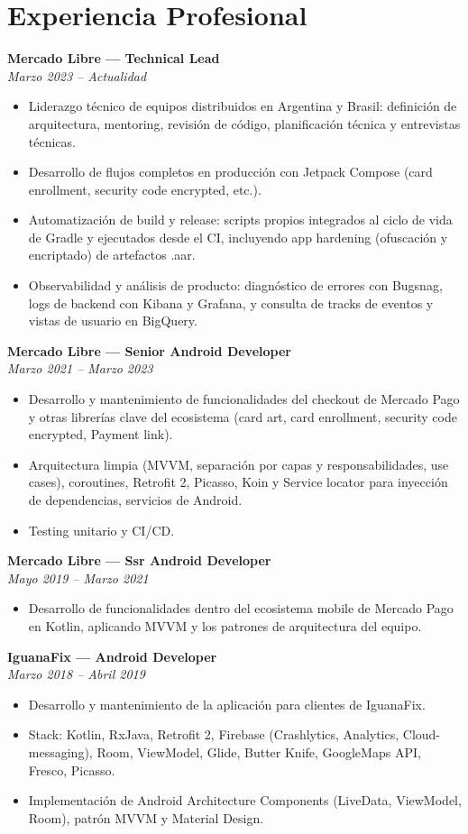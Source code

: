 \documentclass[11pt,a4paper]{article}
\newcommand{\jobtitle}[2]{
    \noindent\textbf{#1}\\
    \textit{#2}\par\vspace{0.5em}
}
\begin{document}
\section{Experiencia Profesional}

\jobtitle{Mercado Libre — Technical Lead}{Marzo 2023 – Actualidad}
\begin{itemize}[leftmargin=*]
    \item Liderazgo técnico de equipos distribuidos en Argentina y Brasil: definición de arquitectura, mentoring, revisión de código, planificación técnica y entrevistas técnicas.
    \item Desarrollo de flujos completos en producción con Jetpack Compose (card enrollment, security code encrypted, etc.).
    \item Automatización de build y release: scripts propios integrados al ciclo de vida de Gradle y ejecutados desde el CI, incluyendo app hardening (ofuscación y encriptado) de artefactos .aar.
    \item Observabilidad y análisis de producto: diagnóstico de errores con Bugsnag, logs de backend con Kibana y Grafana, y consulta de tracks de eventos y vistas de usuario en BigQuery.
\end{itemize}

\jobtitle{Mercado Libre — Senior Android Developer}{Marzo 2021 – Marzo 2023}
\begin{itemize}[leftmargin=*]
    \item Desarrollo y mantenimiento de funcionalidades del checkout de Mercado Pago y otras librerías clave del ecosistema (card art, card enrollment, security code encrypted, Payment link).
    \item Arquitectura limpia (MVVM, separación por capas y responsabilidades, use cases), coroutines, Retrofit 2, Picasso, Koin y Service locator para inyección de dependencias, servicios de Android.
    \item Testing unitario y CI/CD.
\end{itemize}

\jobtitle{Mercado Libre — Ssr Android Developer}{Mayo 2019 – Marzo 2021}
\begin{itemize}[leftmargin=*]
    \item Desarrollo de funcionalidades dentro del ecosistema mobile de Mercado Pago en Kotlin, aplicando MVVM y los patrones de arquitectura del equipo.
\end{itemize}

\jobtitle{IguanaFix — Android Developer}{Marzo 2018 – Abril 2019}
\begin{itemize}[leftmargin=*]
    \item Desarrollo y mantenimiento de la aplicación para clientes de IguanaFix.
    \item Stack: Kotlin, RxJava, Retrofit 2, Firebase (Crashlytics, Analytics, Cloud-messaging), Room, ViewModel, Glide, Butter Knife, GoogleMaps API, Fresco, Picasso.
    \item Implementación de Android Architecture Components (LiveData, ViewModel, Room), patrón MVVM y Material Design.
\end{itemize}
\end{document}
